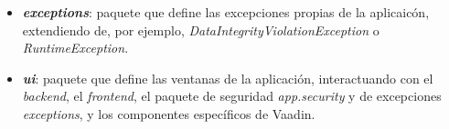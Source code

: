 \begin{itemize}
    \item \textit{\textbf{exceptions}}: paquete que define las excepciones propias de la aplicaicón, extendiendo de, por ejemplo, \textit{DataIntegrityViolationException} o \textit{RuntimeException}.
    
    \item \textit{\textbf{ui}}: paquete que define las ventanas de la aplicación, interactuando con el \textit{backend}, el \textit{frontend}, el paquete de seguridad \textit{app.security} y de excepciones \textit{exceptions}, y los componentes específicos de Vaadin.
\end{itemize}


\begin{landscape}
\end{landscape}